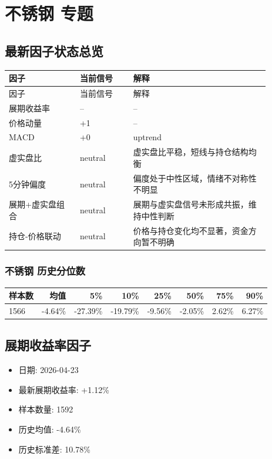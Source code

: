 \documentclass[11pt,a4paper]{ctexart}
\begin{document}
\section{不锈钢 专题}

\subsection{最新因子状态总览}
\begin{longtable}{p{0.24\linewidth}p{0.18\linewidth}p{0.46\linewidth}}
\toprule
因子 & 当前信号 & 解释 \\
\midrule
\endfirsthead
\toprule
因子 & 当前信号 & 解释 \\
\midrule
\endhead
展期收益率 & -- & -- \\
价格动量 & +1 & -- \\
MACD & +0 & uptrend \\
虚实盘比 & neutral & 虚实盘比平稳，短线与持仓结构均衡 \\
5分钟偏度 & neutral & 偏度处于中性区域，情绪不对称性不明显 \\
展期+虚实盘组合 & neutral & 展期与虚实盘信号未形成共振，维持中性判断 \\
持仓-价格联动 & neutral & 价格与持仓变化均不显著，资金方向暂不明确 \\
\bottomrule
\end{longtable}

\subsubsection{不锈钢 历史分位数}
\begin{center}
\begin{tabular}{lrrrrrrr}
\toprule
样本数 & 均值 & 5\% & 10\% & 25\% & 50\% & 75\% & 90\% \\
\midrule
1566 & -4.64\% & -27.39\% & -19.79\% & -9.56\% & -2.05\% & 2.62\% & 6.27\% \\
\bottomrule
\end{tabular}
\end{center}

\subsection{展期收益率因子}
\begin{itemize}
\item 日期: 2026-04-23
\item 最新展期收益率: +1.12\%
\item 样本数量: 1592
\item 历史均值: -4.64\%
\item 历史标准差: 10.78\%
\end{itemize}
\end{document}
